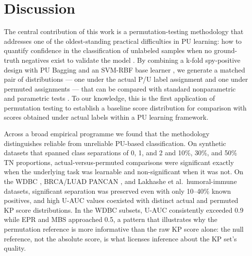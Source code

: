 \documentclass[11pt]{article}
\begin{document}
\section{Discussion}

The central contribution of this work is a permutation-testing methodology that addresses one of the oldest-standing practical difficulties in PU learning: how to quantify confidence in the classification of unlabeled samples when no ground-truth negatives exist to validate the model \cite{bekker2020pulearning,elkan2008learning,li2022pulearning}. By combining a k-fold spy-positive design \cite{liu2003spy} with PU Bagging \cite{mordelet2014bagging,breiman1996bagging} and an SVM-RBF base learner \cite{pedregosa2011scikit}, we generate a matched pair of distributions --- one under the actual P/U label assignment and one under permuted assignments --- that can be compared with standard nonparametric and parametric tests \cite{cliff1993dominance,ojala2010permutation,hanley1982auc}. To our knowledge, this is the first application of permutation testing to establish a baseline score distribution for comparison with scores obtained under actual labels within a PU learning framework.

Across a broad empirical programme we found that the methodology distinguishes reliable from unreliable PU-based classification. On synthetic datasets that spanned class separations of 0, 1, and 2 and 10\%, 30\%, and 50\% TN proportions, actual-versus-permuted comparisons were significant exactly when the underlying task was learnable and non-significant when it was not. On the WDBC \cite{wolberg1999nuclear,wolberg2002computer}, BRCA/LUAD PANCAN \cite{weinstein2013tcga}, and Lakhashe et al.\ humoral-immune \cite{lakhashe2022virosomal,marasini2021enshivig,malherbe2021adenovirus} datasets, significant separation was preserved even with only 10--40\% known positives, and high U-AUC values \cite{hanley1982auc} coexisted with distinct actual and permuted KP score distributions. In the WDBC subsets, U-AUC consistently exceeded 0.9 while EPR and MBS approached 0.5, a pattern that illustrates why the permutation reference is more informative than the raw KP score alone: the null reference, not the absolute score, is what licenses inference about the KP set's quality.
\end{document}
